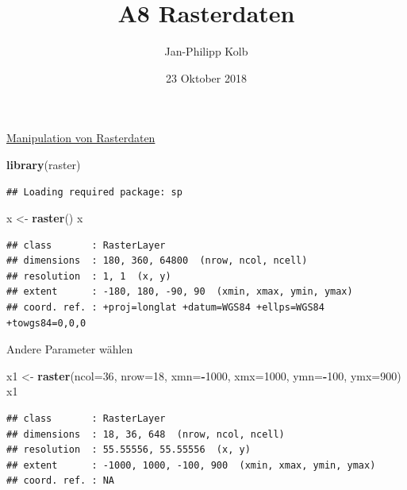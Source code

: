 \documentclass[ignorenonframetext,]{beamer}
\title{A8 Rasterdaten}
\author{Jan-Philipp Kolb}
\date{23 Oktober 2018}
\newenvironment{Shaded}{\begin{snugshade}}{\end{snugshade}}
\newcommand{\DataTypeTok}[1]{\textcolor[rgb]{0.13,0.29,0.53}{#1}}
\newcommand{\DecValTok}[1]{\textcolor[rgb]{0.00,0.00,0.81}{#1}}
\newcommand{\KeywordTok}[1]{\textcolor[rgb]{0.13,0.29,0.53}{\textbf{#1}}}
\newcommand{\NormalTok}[1]{#1}
\newcommand{\OperatorTok}[1]{\textcolor[rgb]{0.81,0.36,0.00}{\textbf{#1}}}
\newcommand{\StringTok}[1]{\textcolor[rgb]{0.31,0.60,0.02}{#1}}
\begin{document}
\frame{\titlepage}

\begin{frame}[fragile]{\href{http://rspatial.org/spatial/rst/8-rastermanip.html}{Manipulation
von Rasterdaten}}
\protect\hypertarget{manipulation-von-rasterdaten}{}

\begin{Shaded}
\begin{Highlighting}[]
\KeywordTok{library}\NormalTok{(raster)}
\end{Highlighting}
\end{Shaded}

\begin{verbatim}
## Loading required package: sp
\end{verbatim}

\begin{Shaded}
\begin{Highlighting}[]
\NormalTok{x <-}\StringTok{ }\KeywordTok{raster}\NormalTok{()}
\NormalTok{x}
\end{Highlighting}
\end{Shaded}

\begin{verbatim}
## class       : RasterLayer 
## dimensions  : 180, 360, 64800  (nrow, ncol, ncell)
## resolution  : 1, 1  (x, y)
## extent      : -180, 180, -90, 90  (xmin, xmax, ymin, ymax)
## coord. ref. : +proj=longlat +datum=WGS84 +ellps=WGS84 +towgs84=0,0,0
\end{verbatim}

\end{frame}

\begin{frame}[fragile]{Andere Parameter wählen}
\protect\hypertarget{andere-parameter-wahlen}{}

\begin{Shaded}
\begin{Highlighting}[]
\NormalTok{x1 <-}\StringTok{ }\KeywordTok{raster}\NormalTok{(}\DataTypeTok{ncol=}\DecValTok{36}\NormalTok{, }\DataTypeTok{nrow=}\DecValTok{18}\NormalTok{, }\DataTypeTok{xmn=}\OperatorTok{-}\DecValTok{1000}\NormalTok{, }\DataTypeTok{xmx=}\DecValTok{1000}\NormalTok{, }\DataTypeTok{ymn=}\OperatorTok{-}\DecValTok{100}\NormalTok{, }\DataTypeTok{ymx=}\DecValTok{900}\NormalTok{)}
\NormalTok{x1}
\end{Highlighting}
\end{Shaded}

\begin{verbatim}
## class       : RasterLayer 
## dimensions  : 18, 36, 648  (nrow, ncol, ncell)
## resolution  : 55.55556, 55.55556  (x, y)
## extent      : -1000, 1000, -100, 900  (xmin, xmax, ymin, ymax)
## coord. ref. : NA
\end{verbatim}

\end{frame}
\end{document}

